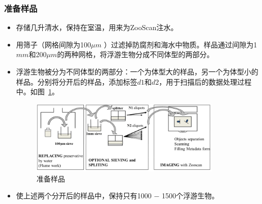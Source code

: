 \documentclass[12pt]{article}
\begin{document}
\subsubsection{准备样品}
\begin{itemize}
\item 存储几升清水，保持在室温，用来为ZooScan注水。
\item 用筛子（网格间隙为100$\mu m$ ）过滤掉防腐剂和海水中物质。样品通过间隙为1$mm$和200$\mu m$的两种网格，将浮游生物分成不同体型的两部分。
\item 浮游生物被分为不同体型的两部分：一个为体型大的样品，另一个为体型小的样品。分别将分开后的样品，添加标签$d1$和$d2$，用于扫描后的数据处理过程中。如图~\ref{fig:volume}。
  \begin{figure}[!ht]
  \centering
   \includegraphics[width=3.6in]{volume}
    \caption{准备样品}
    \label{fig:volume}
   \end{figure}
\item 使上述两个分开后的样品中，保持只有1000 $ - $ 1500个浮游生物。
\end{itemize}
\end{document}
